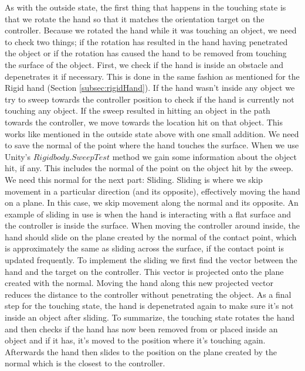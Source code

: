 As with the outside state, the first thing that happens in the touching state is that we rotate the hand so that it matches the orientation target on the controller. Because we rotated the hand while it was touching an object, we need to check two things; if the rotation has resulted in the hand having penetrated the object or if the rotation has caused the hand to be removed from touching the surface of the object. First, we check if the hand is inside an obstacle and depenetrates it if necessary. This is done in the same fashion as mentioned for the Rigid hand (Section \ref{subsec:rigidHand}). If the hand wasn't inside any object we try to sweep towards the controller position to check if the hand is currently not touching any object. If the sweep resulted in hitting an object in the path towards the controller, we move towards the location hit on that object. This works like mentioned in the outside state above with one small addition. We need to save the normal of the point where the hand touches the surface. When we use Unity's $Rigidbody.SweepTest$ method we gain some information about the object hit, if any. This includes the normal of the point on the object hit by the sweep. We need this normal for the next part: Sliding. Sliding is where we skip movement in a particular direction (and its opposite), effectively moving the hand on a plane. In this case, we skip movement along the normal and its opposite. An example of sliding in use is when the hand is interacting with a flat surface and the controller is inside the surface. When moving the controller around inside, the hand should slide on the plane created by the normal of the contact point, which is approximately the same as sliding across the surface, if the contact point is updated frequently. To implement the sliding we first find the vector between the hand and the target on the controller. This vector is projected onto the plane created with the normal. Moving the hand along this new projected vector reduces the distance to the controller without penetrating the object. As a final step for the touching state, the hand is depenetrated again to make sure it's not inside an object after sliding. To summarize, the touching state rotates the hand and then checks if the hand has now been removed from or placed inside an object and if it has, it's moved to the position where it's touching again. Afterwards the hand then slides to the position on the plane created by the normal which is the closest to the controller.

